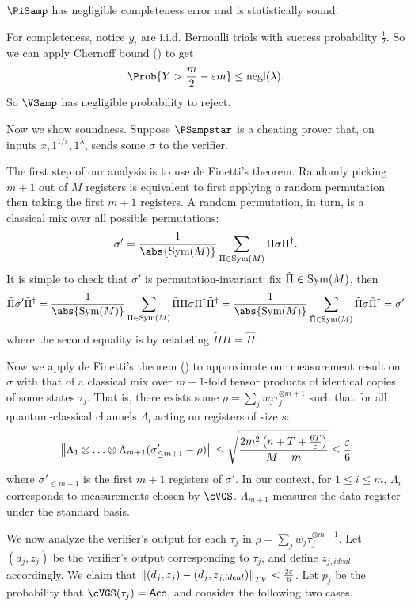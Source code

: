 \begin{thm}
    \label{QPIP1thm}
	$\PiSamp$ has negligible completeness error and is statistically sound.
\end{thm}
\begin{prf}
	For completeness, notice $y_i$ are i.i.d. Bernoulli trials with success probability $\frac{1}{2}$.
	So we can apply Chernoff bound () to get
	$$\Prob{Y>\frac{m}{2}-\varepsilon m}\leq\negl(\lambda).$$
	So $\VSamp$ has negligible probability to reject.
	
	Now we show soundness.
	Suppose $\PSampstar$ is a cheating prover that, on inputs $x, 1^{1/\varepsilon}, 1^\lambda$, sends some $\sigma$ to the verifier.

	The first step of our analysis is to use de Finetti's theorem.
	Randomly picking $m+1$ out of $M$ registers is equivalent to first applying a random permutation then taking the first $m+1$ registers.
	A random permutation, in turn, is a classical mix over all possible permutations:
	$$\sigma'=\frac{1}{\abs{\Sym(M)}}\sum_{\Pi\in\Sym(M)}\Pi\sigma\Pi^\dagger.$$
	It is simple to check that $\sigma'$ is permutation-invariant:
	fix $\tilde{\Pi}\in\operatorname{Sym}(M)$, then
	$$\tilde{\Pi}\sigma'\tilde{\Pi}^\dagger
	=\frac{1}{\abs{\Sym(M)}}\sum_{\Pi\in\Sym(M)}\tilde{\Pi}\Pi\sigma\Pi^\dagger\tilde{\Pi}^\dagger
	=\frac{1}{\abs{\Sym(M)}}\sum_{\hat{\Pi}\in\Sym(M)}\hat{\Pi}\sigma\hat{\Pi}^\dagger
	=\sigma'$$
	where the second equality is by relabeling $\tilde{\Pi}\Pi=\hat{\Pi}$.

	Now we apply de Finetti's theorem () to approximate our measurement result on $\sigma$ with that of a classical mix over $m+1$-fold tensor products of identical copies of some states $\tau_j$.
	That is, there exists some $\rho=\sum_j w_j\tau_j^{\otimes m+1}$
	such that for all quantum-classical channels $\Lambda_i$ acting on registers of size $s$:
	$$\left\lVert\Lambda_1\otimes\ldots\otimes\Lambda_{m+1}(\sigma'_{\leq m+1}-\rho)\right\rVert
	\leq\sqrt{\frac{2m^2\left(n+T+\frac{6T}{\varepsilon}\right)}{M-m}}
	\leq\frac{\varepsilon}{6}$$
	where $\sigma'_{\leq m+1}$ is the first $m+1$ registers of $\sigma'$.
	In our context, for $1\leq i\leq m$, $\Lambda_i$ corresponds to measurements chosen by $\cVGS$.
	$\Lambda_{m+1}$ measures the data register under the standard basis.
	
	We now analyze the verifier's output for each $\tau_j$ in $\rho=\sum_j w_j\tau_j^{\otimes m+1}$. Let $(d_j, z_j)$ be the verifier's output corresponding to $\tau_j$, and define $z_{j, ideal}$ accordingly.
	We claim that $\left\lVert(d_j, z_j)-(d_j, z_{j, ideal})\right\rVert_{TV}<\frac{2\varepsilon}{6}$.
	Let $p_j$ be the probability that $\cVGS(\tau_j)=\Acc$, and consider the following two cases.


\end{prf}
